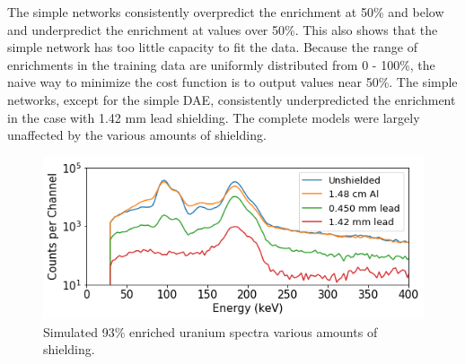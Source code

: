 The simple networks consistently overpredict the enrichment at 50\% and below and underpredict the enrichment at values over 50\%. This also shows that the simple network has too little capacity to fit the data. Because the range of enrichments in the training data are uniformly distributed from 0 - 100\%, the naive way to minimize the cost function is to output values near 50\%. The simple networks, except for the simple DAE, consistently underpredicted the enrichment in the case with 1.42 mm lead shielding. The complete models were largely unaffected by the various amounts of shielding.


\begin{figure}[H]
	\centering
	\includegraphics[width=0.8\linewidth]{images/simulated_uranium_shielding.png}
	\caption{Simulated 93\% enriched uranium spectra various amounts of shielding.}
	\label{fig:simulated_uranium_shielding}
\end{figure}

